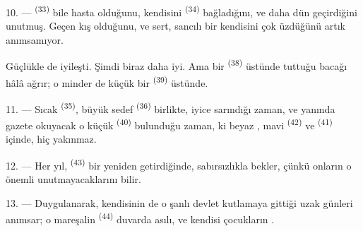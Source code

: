 \VUsaut{4.2mm}
\VUsaut{3.0mm}

10. ---  \textsuperscript{(33)} bile hasta olduğunu,
 kendisini  \textsuperscript{(34)}
bağladığını, ve daha dün  geçirdiğini unutmuş.
Geçen kış  olduğunu, ve sert, sancılı bir 
kendisini çok üzdüğünü artık anımsamıyor.

Güçlükle de iyileşti. Şimdi biraz daha iyi. Ama bir 
\textsuperscript{(38)} üstünde tuttuğu bacağı hâlâ ağrır; o minder de küçük bir
 \textsuperscript{(39)} üstünde.

11. --- Sıcak  \textsuperscript{(35)}, büyük sedef
 \textsuperscript{(36)} birlikte, iyice sarındığı zaman, ve
yanında
gazete okuyacak o küçük  \textsuperscript{(40)} bulunduğu
zaman, ki beyaz , mavi 
\textsuperscript{(42)} ve  \textsuperscript{(41)}
içinde, hiç yakınmaz.

12. --- Her yıl,  \textsuperscript{(43)} bir 
 yeniden getirdiğinde,  sabırsızlıkla
bekler, çünkü onların o önemli  unutmayacaklarını bilir.

13. --- Duygulanarak, kendisinin de o şanlı devlet 
kutlamaya gittiği uzak günleri anımsar; o mareşalin 
\textsuperscript{(44)} duvarda asılı, ve kendisi çocukların
.
\VUsaut{6.0mm}
\VUfilet{22mm}
